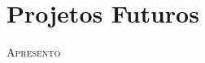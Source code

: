 \chapter{Projetos Futuros}

%


\lettrine[lines=2, lhang=0.33, loversize=0.25, findent=1.5em]{A}{presento} 
\lipsum[110]

\lipsum[49]

\lipsum[50]

\lipsum[51]
